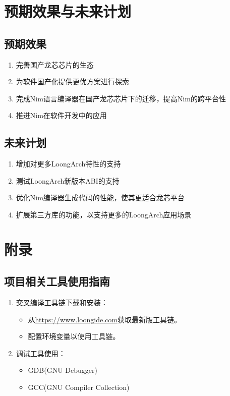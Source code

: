 \documentclass[UTF8]{ctexart}
\begin{document}
\section{预期效果与未来计划} %
	\subsection{预期效果} %
	\begin{enumerate}[leftmargin=3.5em]
		\item 完善国产龙芯芯片的生态
		\item 为软件国产化提供更优方案进行探索
		\item 完成Nim语言编译器在国产龙芯芯片下的迁移，提高Nim的跨平台性
		\item 推进Nim在软件开发中的应用
	\end{enumerate}
	\subsection{未来计划} %
	\begin{enumerate}[leftmargin=3.5em]
		\item 增加对更多LoongArch特性的支持
		\item 测试LoongArch新版本ABI的支持
		\item 优化Nim编译器生成代码的性能，使其更适合龙芯平台
		\item 扩展第三方库的功能，以支持更多的LoongArch应用场景
	\end{enumerate}

\section{附录} %
	\subsection{项目相关工具使用指南} %
	\begin{enumerate}[leftmargin=3.5em]
		\item 交叉编译工具链下载和安装：
		\begin{itemize}[leftmargin=1em]
			\item 从\underline{\url{https://www.loongide.com}}获取最新版工具链。
			\item 配置环境变量以使用工具链。
		\end{itemize}
		\item 调试工具使用：%
		\begin{itemize}[leftmargin=1em]
			\item GDB(GNU Debugger)
			\item GCC(GNU Compiler Collection)
		\end{itemize}
	\end{enumerate}
\end{document}
